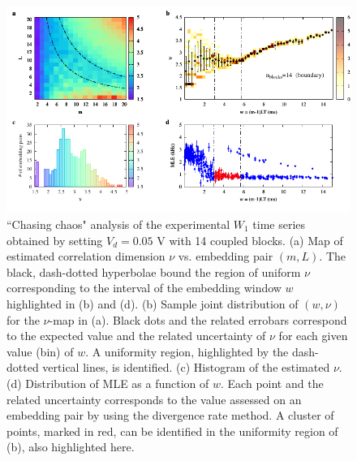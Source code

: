 \begin{figure}[H]
    \centering
    \includegraphics[width=\linewidth]{../blocks/14_blocks/2e5_points/plots/chaos_low.pdf}
    \caption{``Chasing chaos" analysis of the experimental $W_1$ time series obtained by setting $V_d=0.05$ V with 14 coupled blocks.
    (a) Map of estimated correlation dimension $\nu$ vs. embedding pair $(m, L)$.
    The black, dash-dotted hyperbolae bound the region of uniform $\nu$ corresponding to the interval of the
    embedding window $w$ highlighted in (b) and (d).
    (b) Sample joint distribution of $(w,\nu)$ for the $\nu$-map in (a).
    Black dots and the related errobars correspond to the expected value and the related uncertainty of $\nu$
    for each given value (bin) of $w$. A uniformity region, highlighted by the dash-dotted vertical lines,
    is identified. (c) Histogram of the estimated $\nu$. (d) Distribution of MLE as a function of $w$. Each point and the related
    uncertainty corresponds to the value assessed on an embedding pair by using the divergence rate method.
    A cluster of points, marked in red, can be identified in the uniformity region of (b), also highlighted here.}
    \label{fig:14 blocks chaos}
\end{figure}


